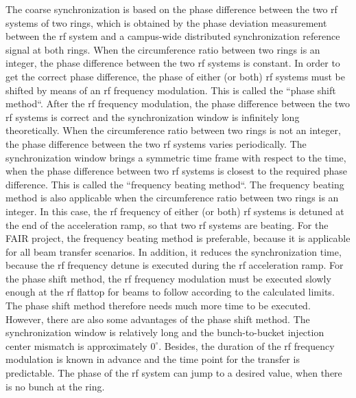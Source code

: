 The coarse synchronization is based on the phase difference between the two rf systems of two rings, which is obtained by the phase deviation measurement between the rf system and a campus-wide distributed synchronization reference signal at both rings. When the circumference ratio between two rings is an integer, the phase difference between the two rf systems is constant. In order to get the correct phase difference, the phase of either (or both) rf systems must be shifted by means of an rf frequency modulation. This is called the ``phase shift method``. After the rf frequency modulation, the phase difference between the two rf systems is correct and the synchronization window is infinitely long theoretically. When the circumference ratio between two rings is not an integer, the phase difference between the two rf systems varies periodically. The synchronization window brings a symmetric time frame with respect to the time, when the phase difference between two rf systems is closest to the required phase difference. This is called the ``frequency beating method``. The frequency beating method is also applicable when the circumference ratio between two rings is an integer. In this case, the rf frequency of either (or both) rf systems is detuned at the end of the acceleration ramp, so that two rf systems are beating. For the FAIR project, the frequency beating method is preferable, because it is applicable for all beam transfer scenarios. In addition, it reduces the synchronization time, because the rf frequency detune is executed during the rf acceleration ramp. For the phase shift method, the rf frequency modulation must be executed slowly enough at the rf flattop for beams to follow according to the calculated limits. The phase shift method therefore needs much more time to be executed. However, there are also some advantages of the phase shift method. The synchronization window is relatively long and the bunch-to-bucket injection center mismatch is approximately $0^\circ$. Besides, the duration of the rf frequency modulation is known in advance and the time point for the transfer is predictable. The phase of the rf system can jump to a desired value, when there is no bunch at the ring.  


